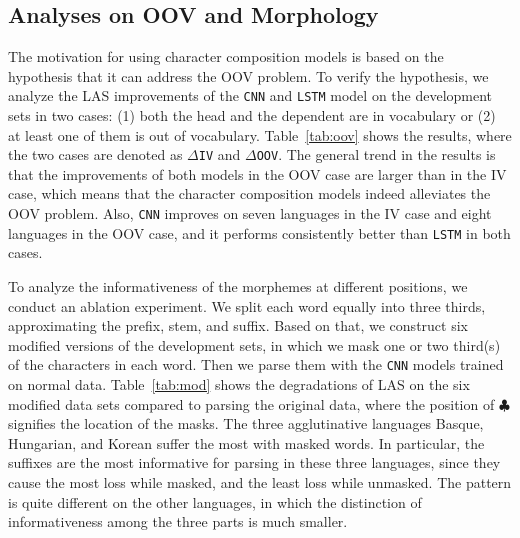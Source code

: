 \documentclass[11pt,a4paper]{article}
\begin{document}
\subsection{Analyses on OOV and Morphology}
    The motivation for using character composition models is based on the hypothesis that it can address the OOV problem.
    To verify the hypothesis, we analyze the LAS improvements of the \texttt{CNN} and \texttt{LSTM} model on the development sets in two cases: (1) both the head and the dependent are in vocabulary or (2) at least one of them is out of vocabulary. 
    Table~\ref{tab:oov} shows the results, where the two cases are denoted as \texttt{$\Delta$IV} and  \texttt{$\Delta$OOV}.
    The general trend in the results is that the improvements of both models in the OOV case are larger than in the IV case, which means that the character composition models indeed alleviates the OOV problem. 
    Also, \texttt{CNN} improves on seven languages in the IV case and eight languages in the OOV case, and it performs consistently better than \texttt{LSTM} in both cases.


    To analyze the informativeness of the morphemes at different positions, we conduct an ablation experiment.
    We split each word equally into three thirds, approximating the prefix, stem, and suffix.
    Based on that, we construct six modified versions of the development sets, in which we mask one or two third(s) of the characters in each word.
    Then we parse them with the \texttt{CNN} models trained on normal data. Table~\ref{tab:mod} shows the degradations of LAS on the six modified data sets compared to parsing the original data, where the position of $\clubsuit$ signifies the location of the masks.
    The three agglutinative languages Basque, Hungarian, and Korean suffer the most with masked words. In particular, the suffixes are the most informative for parsing in these three languages, since they cause the most loss while masked, and the least loss while unmasked. 
    The pattern is quite different on the other languages, in which the distinction of informativeness among the three parts is much smaller.
\end{document}
